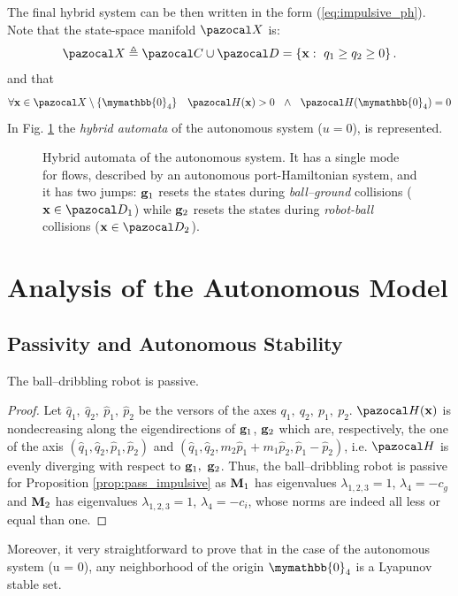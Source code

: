 %
The final hybrid system can be then written in the form (\ref{eq:impulsive_ph}).
%
Note that the state-space manifold $\X$ is:
\begin{equation}
    \X \triangleq \C\cup\D = \left\{\xb:~q_1\geq q_2\geq 0\right\}.
\end{equation}
%
and that
%
\begin{align}
    \forall \xb\in\X\setminus\{\mymathbb{0}_4\}~~~\Ha(\xb)>0~~\land~~\Ha(\mymathbb{0}_4)=0
\end{align}
In Fig. \ref{fig:uHPH} the \textit{hybrid automata} of the autonomous system ($u = 0$), is represented.
%
\begin{figure}[!ht]
	\centering
	
	\caption{Hybrid automata of the autonomous system. It has a single mode for flows, described by an autonomous port-Hamiltonian system, and it has two jumps: $\mathbf{g}_1$ resets the states during  \textit{ball--ground} collisions ($\xb\in\D_1$) while $\mathbf{g}_2$ resets the states during  \textit{robot-ball} collisions ($\xb\in\D_2$).}
	\label{fig:uHPH}
\end{figure}
\newpage

\section{Analysis of the Autonomous Model}\label{sec:analysis_aut}
\subsection{Passivity and Autonomous Stability}
%
\begin{prop}
    The ball--dribbling robot is passive.
\end{prop}
%
\begin{proof}
    Let $\hat{q}_1,~\hat{q}_2,~\hat{p}_1,~\hat{p}_2$ be the versors of the axes ${q}_1,~{q}_2,~{p}_1,~{p}_2$.
    $\Ha(\xb)$ is nondecreasing along the eigendirections of $\mathbf{g}_1$, $\mathbf{g}_2$ which are, respectively, the one of the axis $(\hat{q}_1,\hat{q}_2,\hat{p}_1,\hat{p}_2)$ and $(\hat{q}_1, \hat{q}_2,m_2\hat{p}_1 + m_1\hat{p}_2,\hat{p}_1-\hat{p}_2)$, i.e. $\Ha$ is evenly diverging with respect to $\mathbf{g}_1,~\mathbf{g}_2$.
    Thus, the ball--dribbling robot is passive for Proposition \ref{prop:pass_impulsive} as
    $\mathbf{M}_1$ has eigenvalues $\lambda_{1,2,3} = 1$, $\lambda_4 = -c_g$ and $\mathbf{M}_2$ has eigenvalues $\lambda_{1,2,3} = 1$, $\lambda_4 = -c_i$, whose norms are indeed all less or equal than one.
\end{proof}
%
Moreover, it very straightforward to prove that in the case of the autonomous system (u = 0), any neighborhood of the origin $\mymathbb{0}_4$ is a Lyapunov stable set.
%
